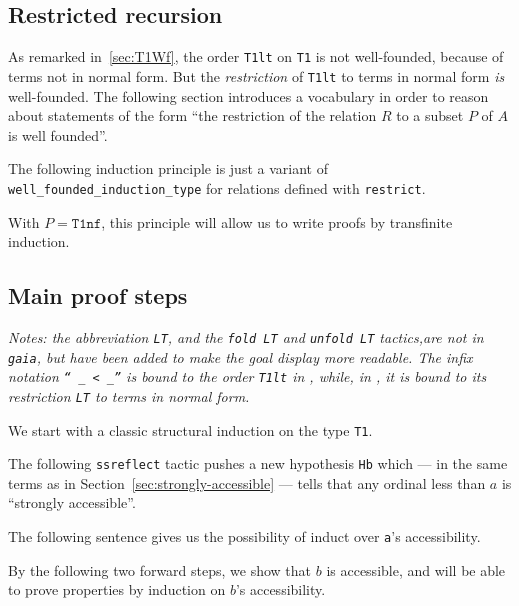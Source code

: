 \subsection{Restricted recursion}
As remarked in~\vref{sec:T1Wf}, the order \texttt{T1lt} on \texttt{T1} is not well-founded, because of terms not in normal form.
But the \emph{restriction} of \texttt{T1lt} to terms in normal form \emph{is} well-founded. The following section introduces a  vocabulary in order to reason about statements of the form  ``the restriction of the relation $R$ to a subset $P$ of $A$ is well founded''.





The following induction principle is just a variant of \texttt{well\_founded\_induction\_type} for relations defined with \texttt{restrict}.


With $P=\texttt{T1nf}$, this principle will allow us to write proofs by transfinite induction.

\subsection{Main proof steps}

\emph{Notes: the abbreviation \texttt{LT}, and the \texttt{fold LT} and \texttt{unfold LT} tactics,are not in \texttt{gaia}, but  have been added to make the goal display more readable.
The infix notation \texttt{`` \_ < \_''}  is bound to the order \texttt{T1lt} in \gaia, while,  in \Hydras,  it is bound to its restriction \texttt{LT} to terms in normal form. }

We start with a classic structural induction on the type \texttt{T1}.

The following \texttt{ssreflect} tactic  pushes a new hypothesis \texttt{Hb} which --- in the same terms as in Section~\vref{sec:strongly-accessible} --- tells that any ordinal less than $a$ is ``strongly accessible''.


The following sentence gives us the possibility of induct over \texttt{a}'s accessibility.



By the following two forward steps, we show that $b$ is accessible, and will be able to prove properties by induction on $b$'s accessibility.

